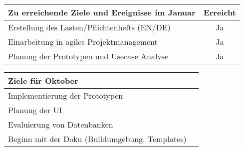 \begin{tabularx}{\textwidth}{Xc}
    \arrayrulecolor{OliveGreen}
    \toprule
    {\bfseries Zu erreichende Ziele und Ereignisse im Januar} & {\bfseries Erreicht} \\
    \midrule[2pt]
    Erstellung des Lasten/Pflichtenhefts (EN/DE)              &Ja                    \\
    \rowcolor{OliveGreen!15}
    Einarbeitung in agiles Projektmanagement                  &Ja                    \\
    \rowcolor{White}
    Planung der Prototypen und Usecase Analyse                &Ja                    \\
    \bottomrule[2pt]
\end{tabularx}
%
\vspace{1cm}
%
\begin{tabularx}{\textwidth}{Xc}
    \arrayrulecolor{OliveGreen}
    \toprule
    {\bfseries Ziele für Oktober}                        &                      \\
    \midrule[2pt]
    Implementierung der Prototypen                       &                      \\
    \rowcolor{OliveGreen!15}
    Planung der UI                                       &                      \\
    \rowcolor{White}
    Evaluierung von Datenbanken                          &                      \\
    \rowcolor{OliveGreen!15}
    Beginn mit der Doku (Buildumgebung, Templates)       &                      \\
\end{tabularx}
